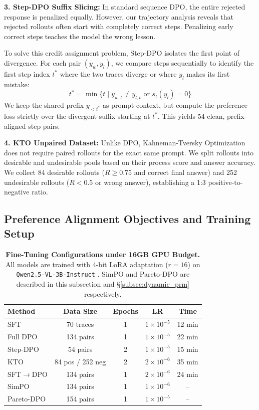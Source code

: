 \documentclass[11pt]{article}
\begin{document}
\textbf{3. Step-DPO Suffix Slicing:} In standard sequence DPO, the entire rejected response is penalized equally. However, our trajectory analysis reveals that rejected rollouts often start with completely correct steps. Penalizing early correct steps teaches the model the wrong lesson. 

To solve this credit assignment problem, Step-DPO isolates the first point of divergence. For each pair $(y_w, y_l)$, we compare steps sequentially to identify the first step index $t^*$ where the two traces diverge or where $y_l$ makes its first mistake:
\begin{equation}
    t^* = \min \{ t \mid y_{w,t} \neq y_{l,t} \text{ or } s_t(y_l) = 0 \}
\end{equation}
We keep the shared prefix $y_{<t^*}$ as prompt context, but compute the preference loss strictly over the divergent suffix starting at $t^*$. This yields 54 clean, prefix-aligned step pairs.

\textbf{4. KTO Unpaired Dataset:} Unlike DPO, Kahneman-Tversky Optimization does not require paired rollouts for the exact same prompt. We split rollouts into desirable and undesirable pools based on their process score and answer accuracy. We collect 84 desirable rollouts ($R \ge 0.75$ and correct final answer) and 252 undesirable rollouts ($R < 0.5$ or wrong answer), establishing a 1:3 positive-to-negative ratio.

\subsection{Preference Alignment Objectives and Training Setup}
\label{subsec:alignment_objectives}

\begin{table}[t]
\centering
\footnotesize
\setlength{\tabcolsep}{2.5pt}
\begin{tabular}{lcccc}
\toprule
\textbf{Method} & \textbf{Data Size} & \textbf{Epochs} & \textbf{LR} & \textbf{Time} \\
\midrule
SFT & 70 traces & 1 & $1\times 10^{-5}$ & 12 min \\
Full DPO & 134 pairs & 1 & $1\times 10^{-5}$ & 22 min \\
Step-DPO & 54 pairs & 2 & $1\times 10^{-5}$ & 15 min \\
KTO & 84 pos / 252 neg & 2 & $2\times 10^{-6}$ & 35 min \\
SFT$\rightarrow$DPO & 134 pairs & 1 & $2\times 10^{-6}$ & 24 min \\
SimPO & 134 pairs & 1 & $1\times 10^{-6}$ & -- \\
Pareto-DPO & 154 pairs & 1 & $1\times 10^{-5}$ & -- \\
\bottomrule
\end{tabular}
\caption{\textbf{Fine-Tuning Configurations under 16GB GPU Budget.} All models are trained with 4-bit LoRA adaptation ($r=16$) on \texttt{Qwen2.5-VL-3B-Instruct} \citep{bai2025qwen25vl}. SimPO and Pareto-DPO are described in this subsection and \S\ref{subsec:dynamic_prm} respectively.}
\label{tab:training_setup}
\end{table}
\end{document}

